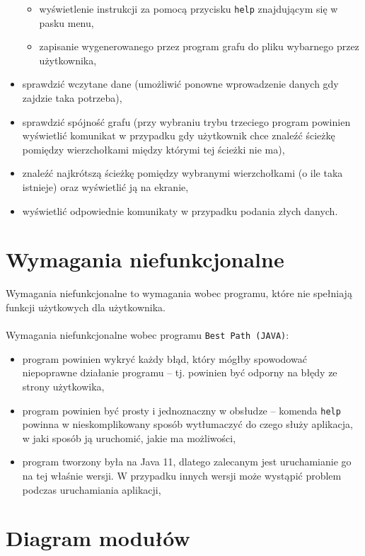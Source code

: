 \documentclass[12pt, a4paper]{article}
\begin{document}
\begin{itemize}
\begin{itemize}
\begin{itemize}
        \end{itemize}
        \item wyświetlenie instrukcji za pomocą przycisku \texttt{help} znajdującym się w pasku menu,
        \item zapisanie wygenerowanego przez program grafu do pliku wybarnego przez użytkownika,
    \end{itemize}
    \item sprawdzić wczytane dane (umożliwić ponowne wprowadzenie danych gdy zajdzie taka potrzeba),
    \item sprawdzić spójność grafu (przy wybraniu trybu trzeciego program powinien wyświetlić komunikat w przypadku gdy użytkownik chce znaleźć ścieżkę pomiędzy wierzchołkami między którymi tej ścieżki nie ma),
    \item znaleźć najkrótszą ścieżkę pomiędzy wybranymi wierzchołkami (o ile taka istnieje) oraz wyświetlić ją na ekranie,
    \item wyświetlić odpowiednie komunikaty w przypadku podania złych danych.
\end{itemize}

\section{Wymagania niefunkcjonalne}
Wymagania niefunkcjonalne to wymagania wobec programu, które nie spełniają funkcji użytkowych dla użytkownika.\\\\
Wymagania niefunkcjonalne wobec programu \texttt{Best Path (JAVA)}: 
\begin{itemize}
    \item program powinien wykryć każdy błąd, który mógłby spowodować niepoprawne działanie programu -- tj. powinien być odporny na błędy ze strony użytkowika,
    \item program powinien być prosty i jednoznaczny w obsłudze -- komenda \texttt{help} powinna w nieskomplikowany sposób wytłumaczyć do czego służy aplikacja, w jaki sposób ją uruchomić, jakie ma możliwości,
    \item program tworzony była na Java 11, dlatego zalecanym jest uruchamianie go na tej właśnie wersji. W przypadku innych wersji może wystąpić problem podczas uruchamiania aplikacji,
\end{itemize}

\section{Diagram modułów}
\end{document}
